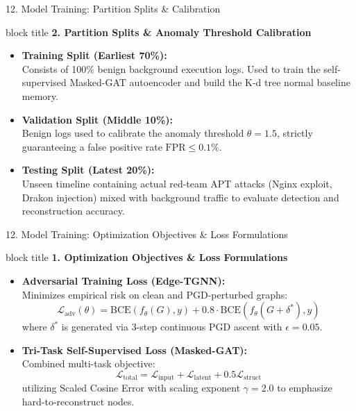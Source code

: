 \documentclass[aspectratio=169,10pt]{beamer}
\begin{document}
\begin{frame}{12. Model Training: Partition Splits \& Calibration}
\vspace{0.3em}
\begin{beamercolorbox}[rounded=true,shadow=false,sep=0.45em,wd=\textwidth]{block title}
\textbf{\scriptsize 2. Partition Splits \& Anomaly Threshold Calibration}
\end{beamercolorbox}
\vspace{0.3em}
{\fontsize{8.0pt}{11.5pt}\selectfont
\begin{itemize}\itemsep0.45em
  \item \textbf{Training Split (Earliest 70\%):}\\
  Consists of 100\% benign background execution logs. Used to train the self-supervised Masked-GAT autoencoder and build the K-d tree normal baseline memory.
  \item \textbf{Validation Split (Middle 10\%):}\\
  Benign logs used to calibrate the anomaly threshold $\theta=1.5$, strictly guaranteeing a false positive rate $\text{FPR} \le 0.1\%$.
  \item \textbf{Testing Split (Latest 20\%):}\\
  Unseen timeline containing actual red-team APT attacks (Nginx exploit, Drakon injection) mixed with background traffic to evaluate detection and reconstruction accuracy.
\end{itemize}
}
\end{frame}

\begin{frame}{12. Model Training: Optimization Objectives \& Loss Formulations}
\vspace{0.3em}
\begin{beamercolorbox}[rounded=true,shadow=false,sep=0.45em,wd=\textwidth]{block title}
\textbf{\scriptsize 1. Optimization Objectives \& Loss Formulations}
\end{beamercolorbox}
\vspace{0.3em}
{\fontsize{8.0pt}{11.5pt}\selectfont
\begin{itemize}\itemsep0.50em
  \item \textbf{Adversarial Training Loss (Edge-TGNN):}\\
  Minimizes empirical risk on clean and PGD-perturbed graphs:
  $$\mathcal{L}_{\text{adv}}(\theta) = \text{BCE}(f_\theta(G), y) + 0.8 \cdot \text{BCE}(f_\theta(G+\delta^*), y)$$
  where $\delta^*$ is generated via 3-step continuous PGD ascent with $\epsilon=0.05$.
  \item \textbf{Tri-Task Self-Supervised Loss (Masked-GAT):}\\
  Combined multi-task objective:
  $$\mathcal{L}_{\text{total}} = \mathcal{L}_{\text{input}} + \mathcal{L}_{\text{latent}} + 0.5 \mathcal{L}_{\text{struct}}$$
  utilizing Scaled Cosine Error with scaling exponent $\gamma=2.0$ to emphasize hard-to-reconstruct nodes.
\end{itemize}
}
\end{frame}
\end{document}
